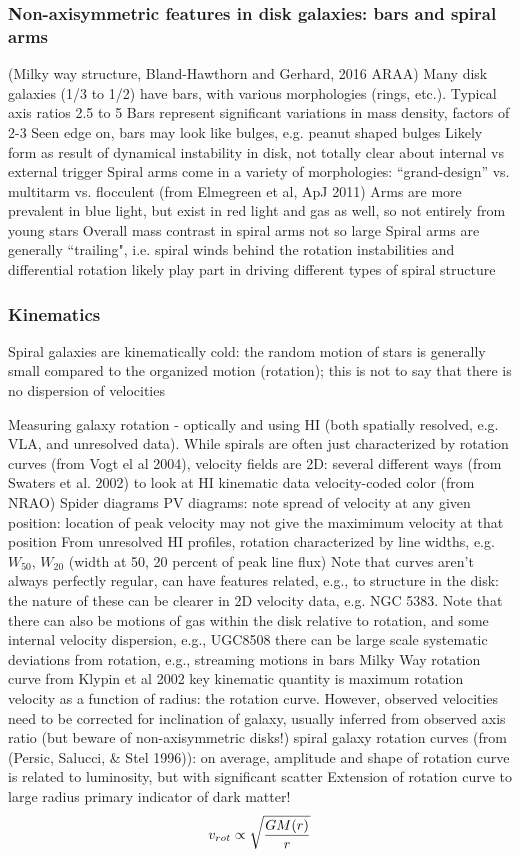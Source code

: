 \documentclass{article}
\begin{document}
\subsubsection{Non-axisymmetric features in disk galaxies: bars and spiral arms}
(Milky way structure, Bland-Hawthorn and Gerhard, 2016 ARAA)
Many disk galaxies (1/3 to 1/2) have bars, with various morphologies
(rings, etc.). Typical axis ratios 2.5 to 5
Bars represent significant variations in mass density, factors of 2-3
Seen edge on, bars may look like bulges, e.g. peanut shaped bulges
Likely form as result of dynamical instability in disk, not totally clear
about internal vs external trigger
Spiral arms come in a variety of morphologies: ``grand-design'' vs.
multitarm vs. flocculent (from Elmegreen et al, ApJ 2011)
Arms are more prevalent in blue light, but exist in red light and gas as
well, so not entirely from young stars
Overall mass contrast in spiral arms not so large
Spiral arms are generally ``trailing", i.e. spiral winds behind the
rotation
instabilities and differential rotation likely play part in driving
different types of spiral structure

\subsubsection{Kinematics}
Spiral galaxies are kinematically cold: the random motion of
stars is generally small compared to the organized motion (rotation); this
is not to say that there is no dispersion of velocities

Measuring galaxy rotation - optically and using HI (both spatially
resolved, e.g. VLA, and unresolved data). While spirals are often just
characterized by rotation curves (from Vogt el al 2004), velocity fields
are 2D:
several different ways (from Swaters et al. 2002) to look at HI kinematic
data
velocity-coded color (from NRAO)
Spider diagrams
PV diagrams: note spread of velocity at any given position: location of
peak velocity may not give the maximimum velocity at that position
From unresolved HI profiles, rotation characterized by line widths, e.g.
$W_{50}$, $W_{20}$ (width at 50, 20 percent of peak line flux)
Note that curves aren't always perfectly regular, can have features
related, e.g., to structure in the disk: the nature of these can be clearer
in 2D velocity data, e.g. NGC 5383. Note that there can also be motions of
gas within the disk relative to rotation, and some internal velocity
dispersion, e.g., UGC8508
there can be large scale systematic deviations from rotation, e.g.,
streaming motions in bars
Milky Way rotation curve from Klypin et al 2002
key kinematic quantity is maximum rotation velocity as a function of
radius: the rotation curve. However, observed velocities need to be
corrected for inclination of galaxy, usually inferred from observed axis
ratio (but beware of non-axisymmetric disks!)
spiral galaxy rotation curves (from (Persic, Salucci, \& Stel 1996)): on
average, amplitude and shape of rotation curve is related to luminosity,
but with significant scatter
Extension of rotation curve to large radius primary indicator of dark
matter!
\begin{displaymath}v_{rot} \propto \sqrt{G M(r)\over r}\end{displaymath}
\end{document}
